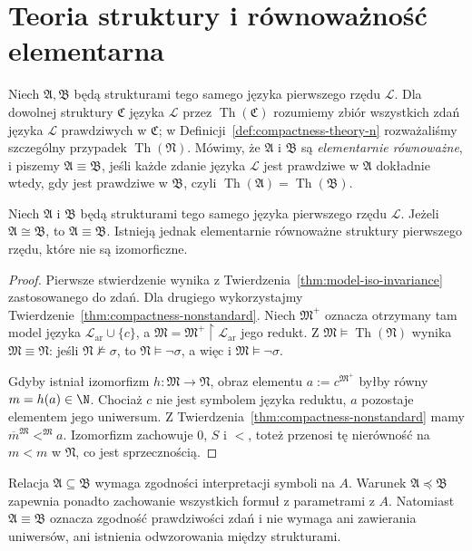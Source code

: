 \section{Teoria struktury i równoważność elementarna}
\begin{definicja}\label{def:model-elementary-equivalence}
Niech $\mathfrak A,\mathfrak B$ będą strukturami tego samego
języka pierwszego rzędu $\mathcal L$.
Dla dowolnej struktury $\mathfrak C$ języka $\mathcal L$ przez
$\operatorname{Th}(\mathfrak C)$ rozumiemy zbiór wszystkich zdań
języka $\mathcal L$ prawdziwych w $\mathfrak C$;
w Definicji~\ref{def:compactness-theory-n} rozważaliśmy
szczególny przypadek $\operatorname{Th}(\mathfrak N)$.
Mówimy, że $\mathfrak A$ i $\mathfrak B$ są
\emph{elementarnie równoważne}, i piszemy
$\mathfrak A\equiv\mathfrak B$, jeśli każde zdanie języka
$\mathcal L$ jest prawdziwe w $\mathfrak A$ dokładnie wtedy,
gdy jest prawdziwe w $\mathfrak B$, czyli
$\operatorname{Th}(\mathfrak A)=\operatorname{Th}(\mathfrak B)$.
\end{definicja}

\begin{twierdzenie}\label{thm:model-iso-elementary}
Niech $\mathfrak A$ i $\mathfrak B$ będą strukturami tego
samego języka pierwszego rzędu $\mathcal L$.
Jeżeli $\mathfrak A\cong\mathfrak B$, to
$\mathfrak A\equiv\mathfrak B$.
Istnieją jednak elementarnie równoważne struktury
pierwszego rzędu, które nie są izomorficzne.
\end{twierdzenie}
\begin{proof}
Pierwsze stwierdzenie wynika z
Twierdzenia~\ref{thm:model-iso-invariance} zastosowanego do zdań.
Dla drugiego wykorzystajmy Twierdzenie~\ref{thm:compactness-nonstandard}.
Niech $\mathfrak M^+$ oznacza otrzymany tam model języka
$\mathcal L_{\mathrm{ar}}\cup\{c\}$, a
$\mathfrak M=\mathfrak M^+\upharpoonright\mathcal L_{\mathrm{ar}}$
jego redukt. Z $\mathfrak M\models\operatorname{Th}(\mathfrak N)$
wynika $\mathfrak M\equiv\mathfrak N$: jeśli
$\mathfrak N\not\models\sigma$, to
$\mathfrak N\models\neg\sigma$, a więc i
$\mathfrak M\models\neg\sigma$.

Gdyby istniał izomorfizm $h:\mathfrak M\to\mathfrak N$,
obraz elementu $a:=c^{\mathfrak M^+}$ byłby równy
$m=h(a)\in\N$. Chociaż $c$ nie jest symbolem języka reduktu,
$a$ pozostaje elementem jego uniwersum.
Z Twierdzenia~\ref{thm:compactness-nonstandard} mamy
$\overline m^{\mathfrak M}<^{\mathfrak M}a$.
Izomorfizm zachowuje $0$, $S$ i $<$, toteż przenosi tę
nierówność na $m<m$ w $\mathfrak N$, co jest sprzecznością.
\end{proof}

\begin{uwaga}
Relacja $\mathfrak A\subseteq\mathfrak B$ wymaga zgodności
interpretacji symboli na $A$.
Warunek $\mathfrak A\preccurlyeq\mathfrak B$ zapewnia ponadto
zachowanie wszystkich formuł z parametrami z $A$.
Natomiast $\mathfrak A\equiv\mathfrak B$ oznacza zgodność
prawdziwości zdań i nie wymaga ani zawierania uniwersów,
ani istnienia odwzorowania między strukturami.
\end{uwaga}
